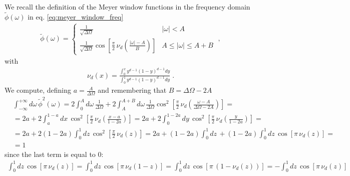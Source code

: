 \documentclass[%
 reprint,
superscriptaddress,
nofootinbib,
 amsmath,amssymb,
 aps,
colorlinks = true, 
linkcolor = blue, 
urlcolor = blue, 
citecolor = blue, 
anchorcolor = blue,
]{revtex4-2}
\begin{document}
We recall the definition of the Meyer window functions in the frequency domain $\tilde{\phi}(\omega)$ in eq. \eqref{eq:meyer_window_freq}
\begin{align}
\tilde\phi(\omega)=\left\{\begin{array}{lr}
\frac{1}{\sqrt{\Delta \Omega}} & |\omega|<A \\
\frac{1}{\sqrt{\Delta \Omega}} \cos \left[\frac{\pi}{2}\,\nu_d\left( \frac{|\omega|-A}{B}\right)\right] &A \leq|\omega| \leq A+B
\end{array}\right.\;,
\end{align}
with
\begin{align}
\nu_d(x)=\frac{\int_0^x y^{d-1}(1-y)^{d-1} d y}{\int_0^1 y^{d-1}(1-y)^{d-1} d y}\;.
\end{align}
%
We compute, defining $a=\frac{A}{\Delta\Omega}$ and remembering that $B=\Delta\Omega-2A$
%
\begin{align}
&\int_{-\infty}^{+\infty} d\omega\, \tilde{\phi}^2(\omega)=2\int_{0}^{A} d\omega\, \frac{1}{\Delta\Omega}+2\int_{A}^{A+B} d\omega\, \frac{1}{\Delta\Omega}\cos^2 \left[\frac{\pi}{2}\,\nu_d\left( \frac{\omega-A}{\Delta\Omega-2A}\right)\right]=\nonumber\\
&=2a+2\int_a^{1-a}dx\,\cos^2 \left[\frac{\pi}{2}\,\nu_d\left( \frac{x-a}{1-2a}\right)\right]=2a+2\int_0^{1-2a}dy\,\cos^2 \left[\frac{\pi}{2}\,\nu_d\left( \frac{y}{1-2a}\right)\right]=\nonumber\\
&=2a+2(1-2a)\int_0^1 dz\,\cos^2 \left[\frac{\pi}{2}\,\nu_d\left( z\right)\right]=2a+(1-2a)\int_0^1 dz\, +(1-2a)\int_0^1 dz\,\cos \left[\pi\,\nu_d\left( z\right)\right]=\nonumber\\
&=1
\end{align}
%
since the last term is equal to 0:
%
\begin{align}
\int_0^1 dz\,\cos \left[\pi\,\nu_d\left( z\right)\right]=\int_0^1 dz\,\cos \left[\pi\,\nu_d\left( 1-z\right)\right]=\int_0^1 dz\,\cos \left[\pi\,(1-\nu_d\left( z\right))\right]=-\int_0^1 dz\,\cos \left[\pi\,\nu_d\left( z\right)\right]
\end{align}


\end{document}
